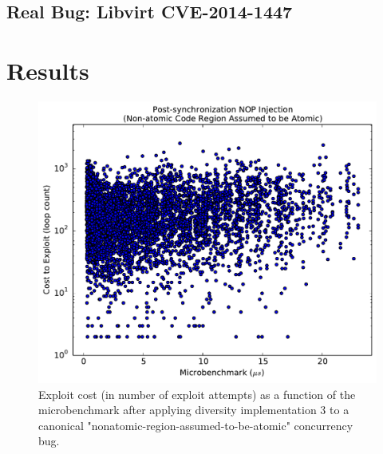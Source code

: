 \documentclass[letterpaper,twocolumn,10pt]{article}
\begin{document}
\subsection{Real Bug: Libvirt CVE-2014-1447}

\section{Results}



\begin{figure}
\centering
\includegraphics[width=\columnwidth]{figures/nonatomic-post}
\caption{Exploit cost (in number of exploit attempts) as a function of the microbenchmark after applying diversity implementation 3 to a canonical "nonatomic-region-assumed-to-be-atomic" concurrency bug.}
\label{fig_nonatomic-post}
\end{figure}
\end{document}
